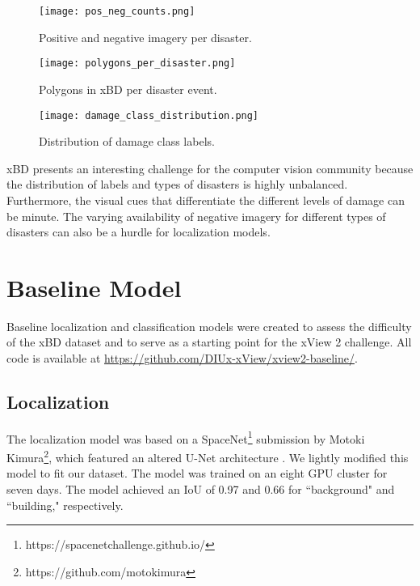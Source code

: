 \documentclass[10pt,twocolumn,letterpaper]{article}
\begin{document}
\begin{figure}[h]
	\begin{center}
		\texttt{[image: pos\_neg\_counts.png]}
	\end{center}
	\caption{Positive and negative imagery per disaster.}
	\label{fig:pos.neg}
\end{figure}

\begin{figure}[h]
	\begin{center}
		\texttt{[image: polygons\_per\_disaster.png]}
	\end{center}
	\caption{Polygons in xBD per disaster event.}
	\label{fig:polygons.per.disaster.counts}
\end{figure}

\begin{figure}[h]
	\begin{center}
		\texttt{[image: damage\_class\_distribution.png]}
	\end{center}
	\caption{Distribution of damage class labels.}
	\label{fig:label.counts}
\end{figure}

xBD presents an interesting challenge for the computer vision community because the distribution of labels and types of disasters is highly unbalanced.
Furthermore, the visual cues that differentiate the different levels of damage can be minute.
The varying availability of negative imagery for different types of disasters can also be a hurdle for localization models.









\section{Baseline Model}
Baseline localization and classification models were created to assess the difficulty of the xBD dataset and to serve as a starting point for the xView 2 challenge. All code is available at \href{https://github.com/DIUx-xView/xview2-baseline/}{https://github.com/DIUx-xView/xview2-baseline/}.

\subsection{Localization}
The localization model was  based on a SpaceNet\footnote{https://spacenetchallenge.github.io/} submission by Motoki Kimura\footnote{https://github.com/motokimura}, which featured an altered U-Net architecture \cite{ronnebergerUNetConvolutionalNetworks2015}.
We lightly modified this model to fit our dataset.
The model was trained on an eight GPU cluster for seven days. The model achieved an IoU of 0.97 and 0.66 for ``background" and ``building," respectively.
\end{document}
